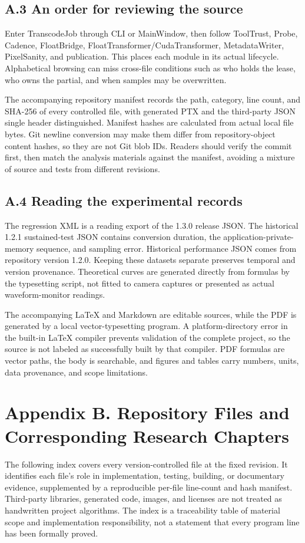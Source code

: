 \documentclass[11pt,a4paper,openany]{book}
\begin{document}
\section*{A.3 An order for reviewing the source}
Enter TranscodeJob through CLI or MainWindow, then follow ToolTrust, Probe, Cadence, FloatBridge, FloatTransformer/CudaTransformer, MetadataWriter, PixelSanity, and publication. This places each module in its actual lifecycle. Alphabetical browsing can miss cross-file conditions such as who holds the lease, who owns the partial, and when samples may be overwritten.

The accompanying repository manifest records the path, category, line count, and SHA-256 of every controlled file, with generated PTX and the third-party JSON single header distinguished. Manifest hashes are calculated from actual local file bytes. Git newline conversion may make them differ from repository-object content hashes, so they are not Git blob IDs. Readers should verify the commit first, then match the analysis materials against the manifest, avoiding a mixture of source and tests from different revisions.


\section*{A.4 Reading the experimental records}
The regression XML is a reading export of the 1.3.0 release JSON. The historical 1.2.1 sustained-test JSON contains conversion duration, the application-private-memory sequence, and sampling error. Historical performance JSON comes from repository version 1.2.0. Keeping these datasets separate preserves temporal and version provenance. Theoretical curves are generated directly from formulas by the typesetting script, not fitted to camera captures or presented as actual waveform-monitor readings.

The accompanying LaTeX and Markdown are editable sources, while the PDF is generated by a local vector-typesetting program. A platform-directory error in the built-in LaTeX compiler prevents validation of the complete project, so the source is not labeled as successfully built by that compiler. PDF formulas are vector paths, the body is searchable, and figures and tables carry numbers, units, data provenance, and scope limitations.


\chapter*{Appendix B. Repository Files and Corresponding Research Chapters}
The following index covers every version-controlled file at the fixed revision. It identifies each file's role in implementation, testing, building, or documentary evidence, supplemented by a reproducible per-file line-count and hash manifest. Third-party libraries, generated code, images, and licenses are not treated as handwritten project algorithms. The index is a traceability table of material scope and implementation responsibility, not a statement that every program line has been formally proved.
\end{document}
